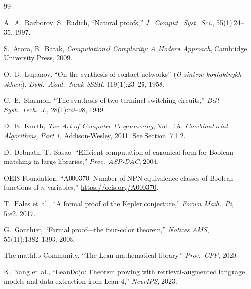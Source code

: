 \documentclass[11pt]{article}
\begin{document}
\begin{thebibliography}{99}

  A.~A.~Razborov, S.~Rudich,
  ``Natural proofs,''
  \textit{J.~Comput.~Syst.~Sci.}, 55(1):24--35, 1997.

  S.~Arora, B.~Barak,
  \textit{Computational Complexity: A Modern Approach},
  Cambridge University Press, 2009.

  O.~B.~Lupanov,
  ``On the synthesis of contact networks''
  (\textit{O sinteze kontaktnykh skhem}),
  \textit{Dokl.~Akad.~Nauk SSSR}, 119(1):23--26, 1958.

  C.~E.~Shannon,
  ``The synthesis of two-terminal switching circuits,''
  \textit{Bell Syst.~Tech.~J.}, 28(1):59--98, 1949.

  D.~E.~Knuth,
  \textit{The Art of Computer Programming}, Vol.~4A:
  \textit{Combinatorial Algorithms, Part 1},
  Addison-Wesley, 2011.
  See Section~7.1.2.

  D.~Debnath, T.~Sasao,
  ``Efficient computation of canonical form for Boolean matching in
  large libraries,''
  \textit{Proc.~ASP-DAC}, 2004.

  OEIS Foundation,
  ``A000370: Number of NPN-equivalence classes of Boolean functions of $n$
  variables,''
  \url{https://oeis.org/A000370}.

  T.~Hales et~al.,
  ``A formal proof of the Kepler conjecture,''
  \textit{Forum Math.~Pi}, 5:e2, 2017.

  G.~Gonthier,
  ``Formal proof---the four-color theorem,''
  \textit{Notices AMS}, 55(11):1382--1393, 2008.

  The mathlib Community,
  ``The Lean mathematical library,''
  \textit{Proc.~CPP}, 2020.

  K.~Yang et~al.,
  ``LeanDojo: Theorem proving with retrieval-augmented language models and
  data extraction from Lean 4,''
  \textit{NeurIPS}, 2023.

\end{thebibliography}
\end{document}
